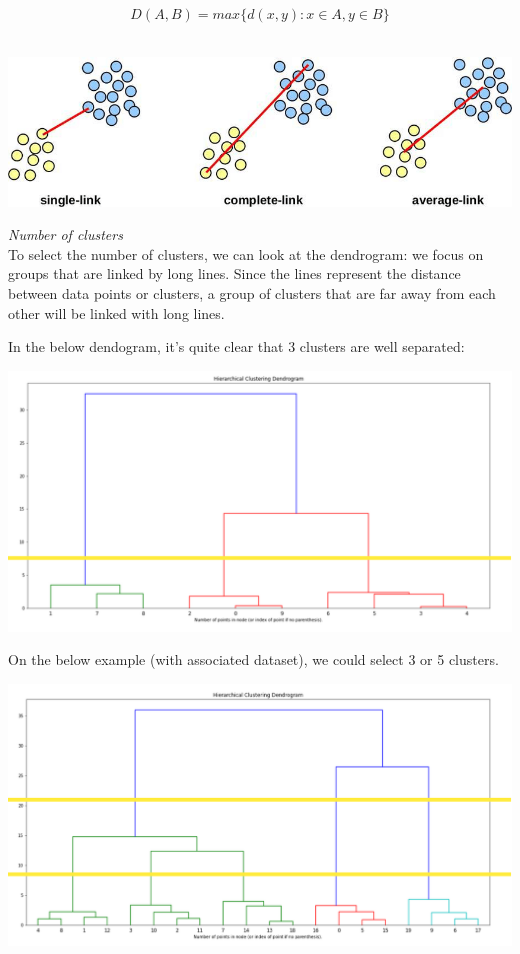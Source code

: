 $$D(A,B) = max\{d(x,y): x \in A, y \in B\}$$ \\

\begin{center}
\includegraphics[scale=0.5]{linkage-distance.png}
\end{center}

\textit{Number of clusters} \\

To select the number of clusters, we can look at the dendrogram: we focus on groups that are linked by long lines. Since the lines represent the distance between data points or clusters, a group of clusters that are far away from each other will be linked with long lines.

In the below dendogram, it's quite clear that 3 clusters are well separated:

\begin{center}
\includegraphics[scale=0.3]{clustering_3.png}
\end{center}

On the below example (with associated dataset), we could select 3 or 5 clusters.

\begin{center}
\includegraphics[scale=0.3]{clustering_5.png}
\end{center}

